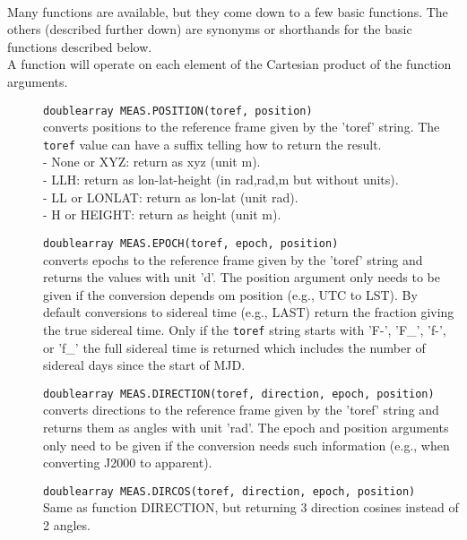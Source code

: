 \paragraph*{}
Many functions are available, but they come down to a few basic
functions.
The others (described further down) are synonyms or shorthands for the
basic functions described below. 
\\A function will operate on each element of the Cartesian product of
the function arguments.
\begin{description}
  \item[] \texttt{doublearray MEAS.POSITION(toref, position)}\\
    converts positions to the reference frame given by the 'toref'
    string. The \texttt{toref} value can have a suffix telling how to return
    the result.
    \\ - None or XYZ: return as xyz (unit m).
    \\ - LLH: return as lon-lat-height (in rad,rad,m but without units).
    \\ - LL or LONLAT: return as lon-lat (unit rad).
    \\ - H or HEIGHT: return as height (unit m).
  \item[] \texttt{doublearray MEAS.EPOCH(toref, epoch, position)}\\
    converts epochs to the reference frame given by the 'toref' string
    and returns the values with unit 'd'.
    The position argument only needs to be given if the conversion
   depends om position (e.g., UTC to LST).
    By default conversions to sidereal time (e.g., LAST) return
    the fraction giving the true sidereal time. Only if the
    \texttt{toref} string starts with 'F-', 'F\_', 'f-', or 'f\_' the
    full sidereal time is returned which includes the number of
    sidereal days since the start of MJD.
  \item[] \texttt{doublearray MEAS.DIRECTION(toref, direction, epoch, position)}\\
    converts directions to the reference frame given by the 'toref'
    string and returns them as angles with unit 'rad'.
    The epoch and position arguments only need to be given if the conversion
    needs such information (e.g., when converting J2000 to apparent).\\
  \item[] \texttt{doublearray MEAS.DIRCOS(toref, direction, epoch, position)}\\
    Same as function DIRECTION, but returning 3 direction cosines instead of 2 angles.\\

\end{description}
